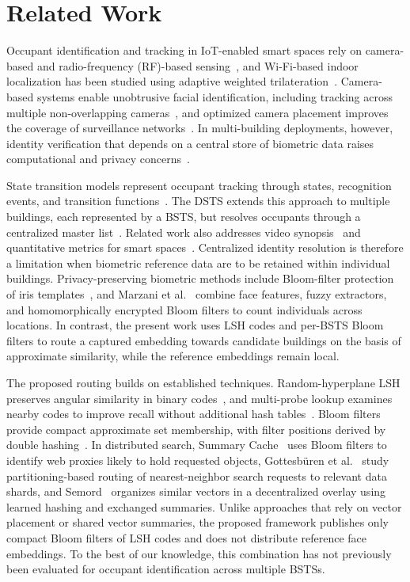 \documentclass[pdflatex,sn-mathphys-num]{sn-jnl}%
\theoremstyle{thmstyleone}%
\theoremstyle{thmstyletwo}%
\theoremstyle{thmstylethree}%
\begin{document}
\section{Related Work}
\label{sec:related}

Occupant identification and tracking in IoT-enabled smart spaces rely on camera-based and radio-frequency (RF)-based sensing~\cite{mohan2020,WZSYGWLLHSC2025}, and Wi-Fi-based indoor localization has been studied using adaptive weighted trilateration~\cite{MSSAB2019}. Camera-based systems enable unobtrusive facial identification, including tracking across multiple non-overlapping cameras~\cite{nair2021}, and optimized camera placement improves the coverage of surveillance networks~\cite{SM2022}. In multi-building deployments, however, identity verification that depends on a central store of biometric data raises computational and privacy concerns~\cite{mohan2020}.

State transition models represent occupant tracking through states, recognition events, and transition functions~\cite{MJG2011}. The DSTS extends this approach to multiple buildings, each represented by a BSTS, but resolves occupants through a centralized master list~\cite{mohan2020}. Related work also addresses video synopsis~\cite{NGA2022} and quantitative metrics for smart spaces~\cite{MMJ2025}. Centralized identity resolution is therefore a limitation when biometric reference data are to be retained within individual buildings. Privacy-preserving biometric methods include Bloom-filter protection of iris templates~\cite{rathgeb2014}, and Marzani et al.~\cite{marzani2026} combine face features, fuzzy extractors, and homomorphically encrypted Bloom filters to count individuals across locations. In contrast, the present work uses LSH codes and per-BSTS Bloom filters to route a captured embedding towards candidate buildings on the basis of approximate similarity, while the reference embeddings remain local.

The proposed routing builds on established techniques. Random-hyperplane LSH preserves angular similarity in binary codes~\cite{charikar2002}, and multi-probe lookup examines nearby codes to improve recall without additional hash tables~\cite{lv2007}. Bloom filters~\cite{bloom1970} provide compact approximate set membership, with filter positions derived by double hashing~\cite{kirsch2006}. In distributed search, Summary Cache~\cite{fan2000} uses Bloom filters to identify web proxies likely to hold requested objects, Gottesb{\"u}ren et al.~\cite{gottesbueren2024} study partitioning-based routing of nearest-neighbor search requests to relevant data shards, and Semord~\cite{wang2026semord} organizes similar vectors in a decentralized overlay using learned hashing and exchanged summaries. Unlike approaches that rely on vector placement or shared vector summaries, the proposed framework publishes only compact Bloom filters of LSH codes and does not distribute reference face embeddings. To the best of our knowledge, this combination has not previously been evaluated for occupant identification across multiple BSTSs.
\end{document}
